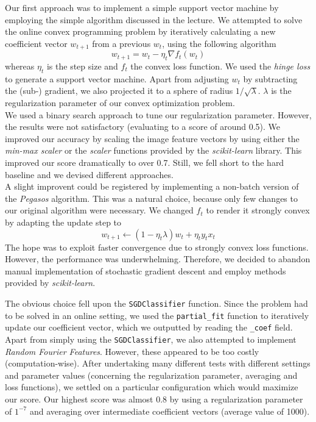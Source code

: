 \documentclass[a4paper, 11pt]{article}
\begin{document}
Our first approach was to implement a simple support vector machine by employing the simple algorithm discussed in the lecture. We attempted to solve the online convex programming problem by iteratively calculating a new coefficient vector $w_{t+1}$ from a previous $w_{t}$, using the following algorithm
$$w_{t+1} = w_{t} - \eta_{t}\nabla f_{t}(w_{t})  $$
whereas $\eta_{t}$ is the step size and $f_{t}$ the convex loss function. We used the \textit{hinge loss} to generate a support vector machine. Apart from adjusting $w_{t}$ by subtracting the (sub-) gradient, we also projected it to a sphere of radius $1/\sqrt{\lambda}$. $\lambda$ is the regularization parameter of our convex optimization problem.\\
We used a binary search approach to tune our regularization parameter. However, the results were not satisfactory (evaluating to a score of around 0.5). We improved our accuracy by scaling the image feature vectors by using either the \textit{min-max scaler} or the \textit{scaler} functions provided by the \textit{scikit-learn} library. This improved our score dramatically to over 0.7. Still, we fell short to the hard baseline and we devised different approaches. \\
A slight improvent could be registered by implementing a non-batch version of the \textit{Pegasos} algorithm. This was a natural choice, because only few changes to our original algorithm were necessary. We changed $f_{t}$ to render it strongly convex by adapting the update step to 
$$ w_{t+1} \leftarrow (1-\eta_{t}\lambda)w_{t} + \eta_{t}y_{t}x_{t} $$
The hope was to exploit faster convergence due to strongly convex loss functions. However, the performance was underwhelming. Therefore, we decided to abandon manual implementation of stochastic gradient descent and employ methods provided by \textit{scikit-learn}. 

The obvious choice fell upon the \texttt{SGDClassifier} function. Since the problem had to be solved in an online setting, we used the \texttt{partial\_fit} function to iteratively update our coefficient vector, which we outputted by reading the \texttt{\_coef} field. Apart from simply using the \texttt{SGDClassifier}, we also attempted to implement \textit{Random Fourier Features}. However, these appeared to be too costly (computation-wise). After undertaking many different tests with different settings and parameter values (concerning the regularization parameter, averaging and loss functions), we settled on a particular configuration which would maximize our score. Our highest score was almost 0.8 by using a regularization parameter of $1^{-7}$ and averaging over intermediate coefficient vectors (average value of 1000).
\newpage
\end{document}
